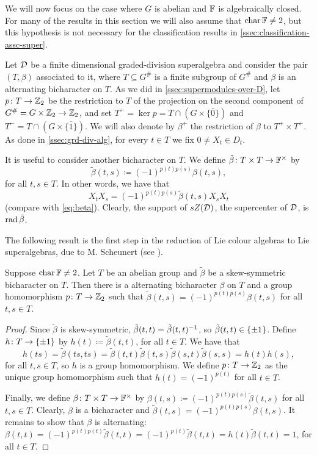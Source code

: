 We will now focus on the case where $G$ is abelian and $\mathbb{F}$ is algebraically closed. 
For many of the results in this section we will also assume that $\operatorname{char} \mathbb{F} \neq 2$, but this hypothesis is not necessary for the classification results in \cref{ssec:classification-assc-super}.

Let $\mathcal{D}$ be a finite dimensional graded-division superalgebra and consider the pair $(T, \beta)$ associated to it, where $T \subseteq G^\#$ is a finite subgroup of $G^\#$ and $\beta$ is an alternating bicharacter on $T$. 
As we did in \cref{ssec:supermodules-over-D}, let $p\colon T \to \mathbb{Z}_2$ be the restriction to $T$ of the projection on the second component of $G^\# = G\times \mathbb{Z}_2 \to \mathbb{Z}_2$, and set $T^+ = \ker p = T \cap (G \times \{ \bar 0 \})$ and $T^- = T \cap (G \times \{ \bar 1 \})$. 
We will also denote by $\beta^+$ the restriction of $\beta$ to $T^+ \times T^+$. 
As done in \cref{ssec:grd-div-alg}, for every $t\in T$ we fix $0 \neq X_t\in D_t$.

It is useful to consider another bicharacter on $T$. 
We define $\tilde\beta\colon T\times T \to \mathbb{F}^\times$ by
\[\label{eq:tilde-beta-def}
    \tilde\beta(t,s) \coloneqq (-1)^{p(t)p(s)}\beta(t,s),
\]
for all $t, s\in T$. 
In other words, we have that
\[\label{eq:tilde-beta}
    X_t X_s = (-1)^{p(t)p(s)} \tilde\beta(t,s) X_s X_t
\]
(compare with \cref{eq:beta}). 
Clearly, the support of $sZ(\mathcal{D})$, the supercenter of $\mathcal{D}$, is $\operatorname{rad} \tilde\beta$. 

The following result is the first step in the reduction of Lie colour algebras to Lie superalgebras, due to M. Scheunert (see \cite{MR529734}). 

\begin{prop}\label{prop:skew-bicharacter-grd-SA}
    Suppose $\operatorname{char} \mathbb{F} \neq 2$. 
    Let $T$ be an abelian group and $\tilde\beta$ be a skew-symmetric bicharacter on $T$. 
    Then there is a alternating bicharacter $\beta$ on $T$ and a group homomorphism $p\colon T \to \mathbb{Z}_2$ such that $\tilde\beta(t,s) = (-1)^{p(t)p(s)}\beta(t,s)$ for all $t,s\in T$.
\end{prop}

\begin{proof}
    Since $\tilde\beta$ is skew-symmetric, $\tilde\beta(t,t) = \tilde\beta(t,t)^{-1}$, so $\tilde\beta(t,t)\in \{ \pm 1 \}$. 
    Define $h\colon T \to \{ \pm 1 \}$ by $h(t) \coloneqq \tilde\beta(t,t)$, for all $t\in T$. 
    We have that 
    \[
        h(ts) = \tilde\beta(ts,ts) = \tilde\beta(t,t)\tilde\beta(t,s)\tilde\beta(s,t)\tilde\beta(s,s) = h(t)h(s),
    \] 
    for all $t,s \in T$, so $h$ is a group homomorphism. 
    We define $p\colon T \to \mathbb{Z}_2$ as the unique group homomorphism such that $h(t) = (-1)^{p(t)}$ for all $t\in T$. 
    
    Finally, we define $\beta\colon T\times T \to \mathbb{F}^\times$ by $\beta(t,s) \coloneqq (-1)^{p(t)p(s)}\tilde\beta(t,s)$ for all $t,s\in T$. 
    Clearly, $\beta$ is a bicharacter and $\tilde\beta(t,s) = (-1)^{p(t)p(s)}\beta(t,s)$. 
    It remains to show that $\beta$ is alternating: 
    $\beta(t,t) = (-1)^{p(t)p(t)}\tilde\beta(t,t) = (-1)^{p(t)}\tilde\beta(t,t) = h(t) \tilde\beta(t,t) = 1$, for all $t\in T$.
\end{proof}

